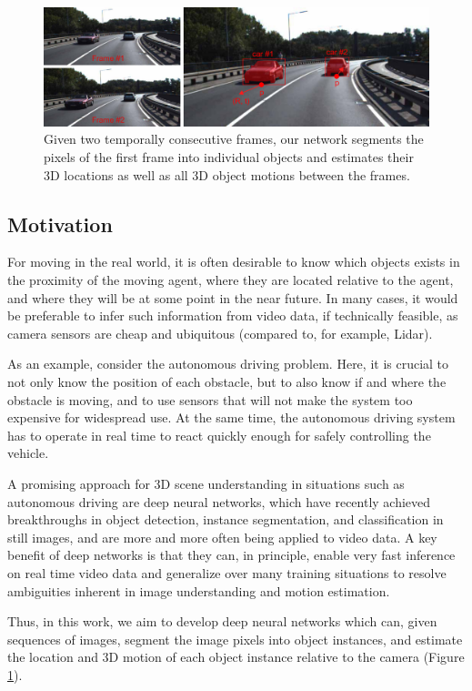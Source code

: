 \begin{figure}[t]
  \centering
  \includegraphics[width=\textwidth]{figures/teaser}
\caption{
Given two temporally consecutive frames,
our network segments the pixels of the first frame into individual objects
and estimates their 3D locations as well as all 3D object motions between the frames.
}
\label{figure:teaser}
\end{figure}

\subsection{Motivation}

For moving in the real world, it is often desirable to know which objects exists
in the proximity of the moving agent,
where they are located relative to the agent,
and where they will be at some point in the near future.
In many cases, it would be preferable to infer such information from video data,
if technically feasible, as camera sensors are cheap and ubiquitous
(compared to, for example, Lidar).

As an example, consider the autonomous driving problem.
Here, it is crucial to not only know the position
of each obstacle, but to also know if and where the obstacle is moving,
and to use sensors that will not make the system too expensive for widespread use.
At the same time, the autonomous driving system has to operate in real time to
react quickly enough for safely controlling the vehicle.

A promising approach for 3D scene understanding in situations such as autonomous driving are deep neural
networks, which have recently achieved breakthroughs in object detection, instance segmentation, and classification
in still images, and are more and more often being applied to video data.
A key benefit of deep networks is that they can, in principle,
enable very fast inference on real time video data and generalize
over many training situations to resolve ambiguities inherent in image understanding
and motion estimation.

Thus, in this work, we aim to develop deep neural networks which can, given
sequences of images, segment the image pixels into object instances, and estimate
the location and 3D motion of each object instance relative to the camera
(Figure \ref{figure:teaser}).

